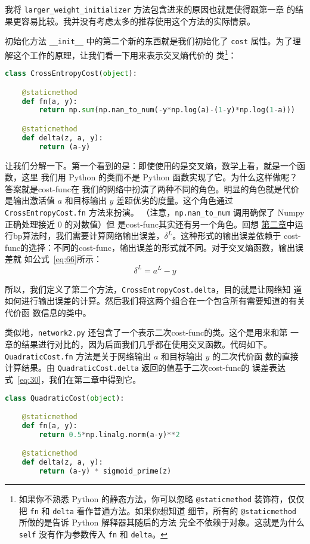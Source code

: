 我将 \lstinline!larger_weight_initializer! 方法包含进来的原因也就是使得跟第一章
的结果更容易比较。我并没有考虑太多的推荐使用这个方法的实际情景。

初始化方法 \lstinline!__init__! 中的第二个新的东西就是我们初始化了
\lstinline!cost! 属性。为了理解这个工作的原理，让我们看一下用来表示交叉熵代价的
类\footnote{如果你不熟悉 Python 的静态方法，你可以忽略 \lstinline!@staticmethod!
  装饰符，仅仅把 \lstinline!fn! 和 \lstinline!delta! 看作普通方法。如果你想知道
  细节，所有的 \lstinline!@staticmethod! 所做的是告诉 Python 解释器其随后的方法
  完全不依赖于对象。这就是为什么 \lstinline!self! 没有作为参数传入
  \lstinline!fn!  和 \lstinline!delta!。}：
\begin{lstlisting}[language=Python]
class CrossEntropyCost(object):

    @staticmethod
    def fn(a, y):
        return np.sum(np.nan_to_num(-y*np.log(a)-(1-y)*np.log(1-a)))

    @staticmethod
    def delta(z, a, y):
        return (a-y)
\end{lstlisting}

让我们分解一下。第一个看到的是：即使使用的是交叉熵，数学上看，就是一个函数，这里
我们用 Python 的类而不是 Python 函数实现了它。为什么这样做呢？答案就是\gls*{cost-func}在
我们的网络中扮演了两种不同的角色。明显的角色就是代价是输出激活值 $a$ 和目标输出
$y$ 差距优劣的度量。这个角色通过 \lstinline!CrossEntropyCost.fn! 方法来扮演。
（注意，\lstinline!np.nan_to_num! 调用确保了 Numpy 正确处理接近 $0$ 的对数值）但
是\gls*{cost-func}其实还有另一个角色。回想%
\hyperref[sec:the_four_fundamental_equations_behind_backpropagation]{第二章}中运
行\gls*{bp}算法时，我们需要计算网络输出误差，$\delta^L$。这种形式的输出误差依赖于
\gls*{cost-func}的选择：不同的\gls*{cost-func}，输出误差的形式就不同。对于交叉熵函数，输出误差就
如公式~\eqref{eq:66}所示：
\begin{equation}
  \delta^L = a^L-y
  \label{eq:99}\tag{99}
\end{equation}

所以，我们定义了第二个方法，\lstinline!CrossEntropyCost.delta!，目的就是让网络知
道如何进行输出误差的计算。然后我们将这两个组合在一个包含所有需要知道的有关代价函
数信息的类中。

类似地，\lstinline!network2.py! 还包含了一个表示二次\gls*{cost-func}的类。这个是用来和第
一章的结果进行对比的，因为后面我们几乎都在使用交叉函数。代码如下。
\lstinline!QuadraticCost.fn! 方法是关于网络输出 $a$ 和目标输出 $y$ 的二次代价函
数的直接计算结果。由 \lstinline!QuadraticCost.delta! 返回的值基于二次\gls*{cost-func}的
误差表达式~\eqref{eq:30}，我们在第二章中得到它。
\begin{lstlisting}[language=Python]
class QuadraticCost(object):

    @staticmethod
    def fn(a, y):
        return 0.5*np.linalg.norm(a-y)**2

    @staticmethod
    def delta(z, a, y):
        return (a-y) * sigmoid_prime(z)
\end{lstlisting}

